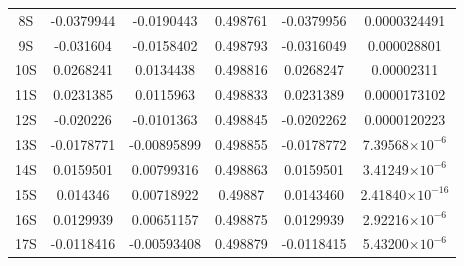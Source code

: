 \documentclass[cs4size,titlepage,twoside]{ctexart}
\begin{document}
\begin{table}[!htbp]
\begin{tabular}{|cccccc|}
		8S                    & -0.0379944               & -0.0190443                     & 0.498761                       & -0.0379956                                                                & 0.0000324491             \\
		9S                    & -0.031604                & -0.0158402                     & 0.498793                       & -0.0316049                                                                & 0.000028801              \\
		10S                   & 0.0268241                & 0.0134438                      & 0.498816                       & 0.0268247                                                                 & 0.00002311               \\
		11S                   & 0.0231385                & 0.0115963                      & 0.498833                       & 0.0231389                                                                 & 0.0000173102             \\
		12S                   & -0.020226                & -0.0101363                     & 0.498845                       & -0.0202262                                                                & 0.0000120223             \\
		13S                   & -0.0178771               & -0.00895899                    & 0.498855                       & -0.0178772                                                                & 7.39568$\times10^{-6}$   \\
		14S                   & 0.0159501                & 0.00799316                     & 0.498863                       & 0.0159501                                                                 & 3.41249$\times10^{-6}$   \\
		15S                   & 0.014346                 & 0.00718922                     & 0.49887                        & 0.0143460                                                                 & 2.41840$\times10^{-16}$  \\
		16S                   & 0.0129939                & 0.00651157                     & 0.498875                       & 0.0129939                                                                 & 2.92216$\times10^{-6}$   \\
		17S                   & -0.0118416               & -0.00593408                    & 0.498879                       & -0.0118415                                                                & 5.43200$\times10^{-6}$   \\

\end{tabular}
\end{table}
\end{document}
